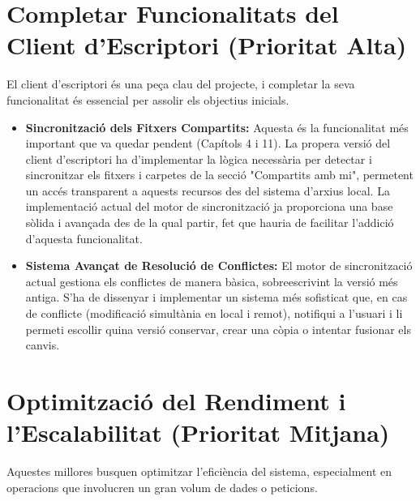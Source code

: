 \section{Completar Funcionalitats del Client d'Escriptori (Prioritat Alta)}

El client d'escriptori és una peça clau del projecte, i completar la seva funcionalitat és essencial per assolir els objectius inicials.

\begin{itemize}
    \item \textbf{Sincronització dels Fitxers Compartits:} Aquesta és la funcionalitat més important que va quedar pendent (Capítols 4 i 11). La propera versió del client d'escriptori ha d'implementar la lògica necessària per detectar i sincronitzar els fitxers i carpetes de la secció "Compartits amb mi", permetent un accés transparent a aquests recursos des del sistema d'arxius local. La implementació actual del motor de sincronització ja proporciona una base sòlida i avançada des de la qual partir, fet que hauria de facilitar l'addició d'aquesta funcionalitat.

    \item \textbf{Sistema Avançat de Resolució de Conflictes:} El motor de sincronització actual gestiona els conflictes de manera bàsica, sobreescrivint la versió més antiga. S'ha de dissenyar i implementar un sistema més sofisticat que, en cas de conflicte (modificació simultània en local i remot), notifiqui a l'usuari i li permeti escollir quina versió conservar, crear una còpia o intentar fusionar els canvis.
\end{itemize}

\section{Optimització del Rendiment i l'Escalabilitat (Prioritat Mitjana)}

Aquestes millores busquen optimitzar l'eficiència del sistema, especialment en operacions que involucren un gran volum de dades o peticions.

